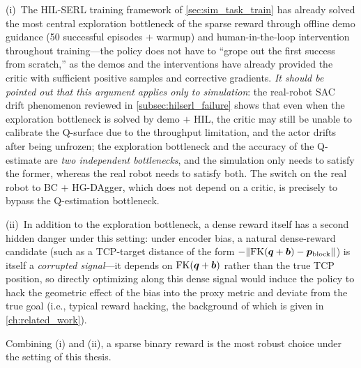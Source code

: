 (i)~The HIL-SERL training framework of \cref{sec:sim_task_train} has already solved the most central exploration bottleneck of the sparse reward through offline demo guidance (50 successful episodes $+$ warmup) and human-in-the-loop intervention throughout training---the policy does not have to ``grope out the first success from scratch,'' as the demos and the interventions have already provided the critic with sufficient positive samples and corrective gradients. \emph{It should be pointed out that this argument applies only to simulation}: the real-robot SAC drift phenomenon reviewed in \cref{subsec:hilserl_failure} shows that even when the exploration bottleneck is solved by demo $+$ HIL, the critic may still be unable to calibrate the Q-surface due to the throughput limitation, and the actor drifts after being unfrozen; the exploration bottleneck and the accuracy of the Q-estimate are \emph{two independent bottlenecks}, and the simulation only needs to satisfy the former, whereas the real robot needs to satisfy both. The switch on the real robot to BC $+$ HG-DAgger, which does not depend on a critic, is precisely to bypass the Q-estimation bottleneck.

(ii)~In addition to the exploration bottleneck, a dense reward itself has a second hidden danger under this setting: under encoder bias, a natural dense-reward candidate (such as a TCP-target distance of the form $-\lVert\text{FK}(\bm{q}+\bm{b}) - \bm{p}_\text{block}\rVert$) is itself a \emph{corrupted signal}---it depends on $\text{FK}(\bm{q}+\bm{b})$ rather than the true TCP position, so directly optimizing along this dense signal would induce the policy to hack the geometric effect of the bias into the proxy metric and deviate from the true goal (i.e., typical reward hacking, the background of which is given in \cref{ch:related_work}).

Combining (i) and (ii), a sparse binary reward is the most robust choice under the setting of this thesis.
